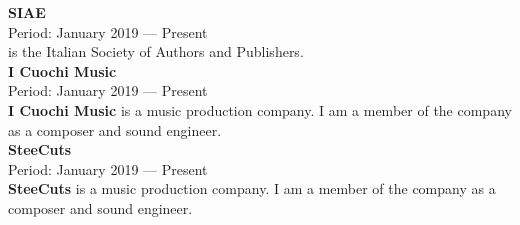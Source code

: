 \documentclass[a4paper,9pt]{extarticle}
\begin{document}
\noindent
\textbf{SIAE} \\
Period: January 2019 --- Present \\
\siae is the Italian Society of Authors and Publishers. \\

\noindent
\textbf{I Cuochi Music} \\
Period: January 2019 --- Present \\
\textbf{I Cuochi Music} is a music production company. I am a member of the company as a composer and sound engineer. \\

\noindent
\textbf{SteeCuts} \\
Period: January 2019 --- Present \\
\textbf{SteeCuts} is a music production company. I am a member of the company as a composer and sound engineer. \\


%
%
%


%
%
%


\end{document}
